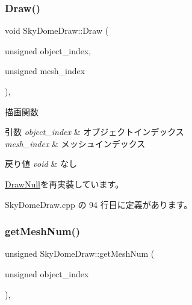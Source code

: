 \subsubsection{\texorpdfstring{Draw()}{Draw()}}
{\footnotesize\ttfamily void Sky\+Dome\+Draw\+::\+Draw (\begin{DoxyParamCaption}\item[{unsigned}]{object\+\_\+index,  }\item[{unsigned}]{mesh\+\_\+index }\end{DoxyParamCaption})\hspace{0.3cm}{\ttfamily [override]}, {\ttfamily [virtual]}}



描画関数 


\begin{DoxyParams}{引数}
{\em object\+\_\+index} & オブジェクトインデックス \\
\hline
{\em mesh\+\_\+index} & メッシュインデックス \\
\hline
\end{DoxyParams}

\begin{DoxyRetVals}{戻り値}
{\em void} & なし \\
\hline
\end{DoxyRetVals}


\mbox{\hyperlink{class_draw_null_a72ac0b7dc40b1469582419dcc5b0e114}{Draw\+Null}}を再実装しています。



 Sky\+Dome\+Draw.\+cpp の 94 行目に定義があります。

\mbox{\label{class_sky_dome_draw_a6b281bafa71c058ee83c373ad978e3bb}} 
\subsubsection{\texorpdfstring{get\+Mesh\+Num()}{getMeshNum()}}
{\footnotesize\ttfamily unsigned Sky\+Dome\+Draw\+::get\+Mesh\+Num (\begin{DoxyParamCaption}\item[{unsigned}]{object\+\_\+index }\end{DoxyParamCaption})\hspace{0.3cm}{\ttfamily [override]}, {\ttfamily [virtual]}}



